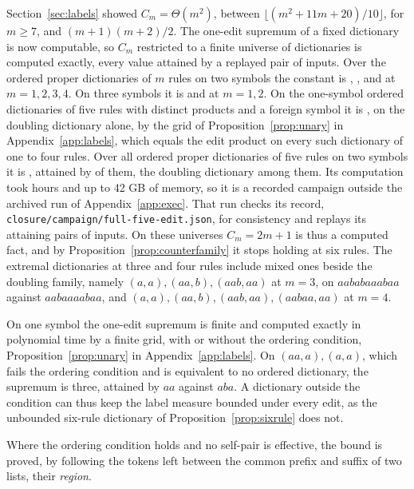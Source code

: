\documentclass[11pt,a4paper]{article}
\theoremstyle{definition}
\theoremstyle{plain}
\newcommand{\code}[1]{\texttt{#1}}
\begin{document}
Section~\ref{sec:labels} showed \(C_m = \Theta(m^2)\), between \(\lfloor (m^2 + 11m + 20)/10 \rfloor\), for \(m \ge 7\),
and \((m + 1)(m + 2)/2\). The one-edit supremum of a fixed dictionary is now computable, so \(C_m\) restricted to a
finite universe of dictionaries is computed exactly, every value attained by a replayed pair of inputs. Over the ordered
proper dictionaries of \(m\) rules on two symbols the constant is \AmpExactOne{}, \AmpExactTwo{}, \AmpExactThree{} and
\AmpExactFour{} at \(m = 1, 2, 3, 4\). On three symbols it is \AmpExactThreeSymOne{} and \AmpExactThreeSymTwo{} at
\(m = 1, 2\). On the one-symbol ordered dictionaries of five rules with distinct products and a foreign symbol it is
\AmpExactUnaryFive{}, on the doubling dictionary alone, by the grid of Proposition~\ref{prop:unary} in
Appendix~\ref{app:labels}, which equals the edit product on every such dictionary of one to four rules. Over all
\FiveEditTables{} ordered proper dictionaries of five rules on two symbols it is \FiveEditMax{}, attained by
\FiveEditAttaining{} of them, the doubling dictionary among them. Its computation took hours and up to 42 GB of memory,
so it is a recorded campaign outside the archived run of Appendix~\ref{app:exec}. That run checks its record,
\code{closure/campaign/full-five-edit.json}, for consistency and replays its \FiveEditAttaining{} attaining pairs of
inputs. On these universes \(C_m = 2m + 1\) is thus a computed fact, and by Proposition~\ref{prop:counterfamily} it
stops holding at six rules. The extremal dictionaries at three and four rules include mixed ones beside the doubling
family, namely \((a,a), (aa,b), (aab,aa)\) at \(m = 3\), on \(aababaaabaa\) against \(aabaaaabaa\), and
\((a,a), (aa,b), (aab,aa), (aabaa,aa)\) at \(m = 4\).

On one symbol the one-edit supremum is finite and computed exactly in polynomial time by a finite grid, with or without
the ordering condition, Proposition~\ref{prop:unary} in Appendix~\ref{app:labels}. On \((aa, a), (a, a)\), which fails
the ordering condition and is equivalent to no ordered dictionary, the supremum is three, attained by \(aa\) against
\(aba\). A dictionary outside the condition can thus keep the label measure bounded under every edit, as the unbounded
six-rule dictionary of Proposition~\ref{prop:sixrule} does not.

Where the ordering condition holds and no self-pair is effective, the bound is proved, by following the tokens left
between the common prefix and suffix of two lists, their \emph{region}.
\end{document}
